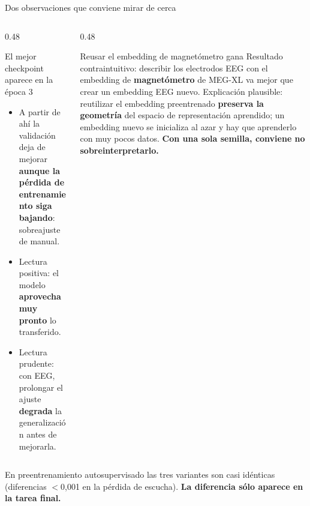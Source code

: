 \documentclass[aspectratio=169,10pt]{beamer}
\newcommand{\term}[1]{\textbf{\color{deepgreen}#1}}
\begin{document}
\begin{frame}[c]{Dos observaciones que conviene mirar de cerca}
  \small
  \begin{columns}[t,totalwidth=\linewidth]
    \begin{column}{0.48\linewidth}
      \begin{alertblock}{El mejor checkpoint aparece en la época 3}
        \begin{itemize}\footnotesize
          \item A partir de ahí la validación deja de mejorar \term{aunque la pérdida de entrenamiento siga bajando}: sobreajuste de manual.
          \item Lectura positiva: el modelo \term{aprovecha muy pronto} lo transferido.
          \item Lectura prudente: con EEG, prolongar el ajuste \term{degrada} la generalización antes de mejorarla.
        \end{itemize}
      \end{alertblock}
    \end{column}
    \begin{column}{0.48\linewidth}
      \begin{block}{Reusar el embedding de magnetómetro gana}
        \footnotesize
        Resultado contraintuitivo: describir los electrodos EEG con el embedding de \term{magnetómetro} de MEG-XL va mejor que crear un embedding EEG nuevo.
        \vspace{1.5mm}
        Explicación plausible: reutilizar el embedding preentrenado \term{preserva la geometría} del espacio de representación aprendido; un embedding nuevo se inicializa al azar y hay que aprenderlo con muy pocos datos.
        \vspace{1.5mm}
        \term{Con una sola semilla, conviene no sobreinterpretarlo.}
      \end{block}
    \end{column}
  \end{columns}
  \vspace{2mm}
  \centering\small
  En preentrenamiento autosupervisado las tres variantes son casi idénticas (diferencias $<$0,001 en la pérdida de escucha). \term{La diferencia sólo aparece en la tarea final.}
\end{frame}
\end{document}
